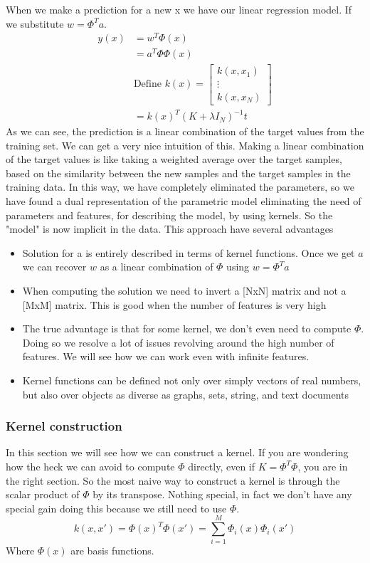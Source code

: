 \documentclass[../main.tex]{subfiles}
\begin{document}
When we make a prediction for a new x we have our linear regression model. If we substitute $w=\Phi^Ta$.
\begin{align*}
    y(x) & = w^T\Phi(x)                      \\
         & = a^T\Phi \Phi(x)                 \\
         & \text{Define }k(x)=
    \begin{bmatrix}
        k(x,x_1) \\
        \vdots   \\
        k(x,x_N)
    \end{bmatrix}                           \\
         & = k(x)^T (K + \lambda I_N)^{-1} t
\end{align*}
As we can see, the prediction is a linear combination of the target values from the training set. We can get a very nice intuition of this. Making a linear combination of the target values is like taking a weighted average over the target samples, based on the similarity between the new samples and the target samples in the training data. In this way, we have completely eliminated the parameters, so we have found a dual representation of the parametric model eliminating the need of parameters and features, for describing the model, by using kernels. So the "model" is now implicit in the data.
This approach have several advantages
\begin{itemize}
    \item Solution for a is entirely described in terms of kernel functions. Once we get $a$ we can recover $w$ as a linear combination of $\Phi$ using $w = \Phi^T a$
    \item When computing the solution we need to invert a [NxN] matrix and not a [MxM] matrix. This is good when the number of features is very high
    \item The true advantage is that for some kernel, we don't even need to compute $\Phi$. Doing so we resolve a lot of issues revolving around the high number of features. We will see how we can work even with infinite features.
    \item Kernel functions can be defined not only over simply vectors of real numbers, but also over objects as diverse as graphs, sets, string, and text documents
\end{itemize}

\subsubsection{Kernel construction}
In this section we will see how we can construct a kernel. If you are wondering how the heck we can avoid to compute $\Phi$ directly, even if $K=\Phi^T \Phi$, you are in the right section.
So the most naive way to construct a kernel is through the scalar product of $\Phi$ by its transpose. Nothing special, in fact we don't have any special gain doing this because we still need to use $\Phi$.
\begin{equation*}
    k(x,x') = \Phi(x)^T \Phi(x') = \sum_{i=1}^M \Phi_i(x) \Phi_i(x')
\end{equation*}
Where $\Phi(x)$ are basis functions.
\end{document}
